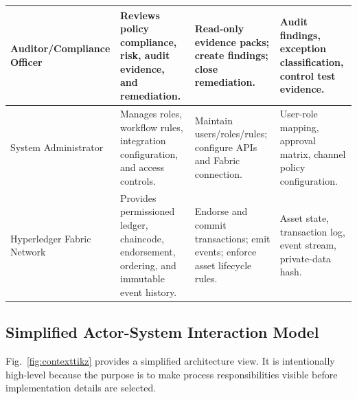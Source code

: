 \documentclass[conference]{IEEEtran}
\begin{document}
\begin{table}[t]
\begin{tabularx}{\textwidth}{|L{3.0cm}|Y|Y|Y|}
Auditor/Compliance Officer & Reviews policy compliance, risk, audit evidence, and remediation. & Read-only evidence packs; create findings; close remediation. & Audit findings, exception classification, control test evidence. \\ \hline
System Administrator & Manages roles, workflow rules, integration configuration, and access controls. & Maintain users/roles/rules; configure APIs and Fabric connection. & User-role mapping, approval matrix, channel policy configuration. \\ \hline
Hyperledger Fabric Network & Provides permissioned ledger, chaincode, endorsement, ordering, and immutable event history. & Endorse and commit transactions; emit events; enforce asset lifecycle rules. & Asset state, transaction log, event stream, private-data hash. \\ \hline
\end{tabularx}
\end{table}

\subsection{Simplified Actor-System Interaction Model}
Fig.~\ref{fig:contexttikz} provides a simplified architecture view. It is intentionally high-level because the purpose is to make process responsibilities visible before implementation details are selected.
\end{document}
